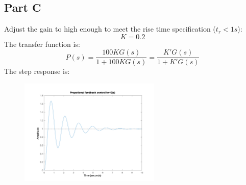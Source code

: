 \documentclass[a4paper]{article}
\begin{document}
\subsection{Part C} 
Adjust the gain to high enough to meet the rise time specification ($t_r < 1 s$):
$$
K = 0.2
$$
The transfer function is:
$$
P(s)  =\frac{100KG(s)}{1+100KG(s)} = \frac{K'G(s)}{1+K'G(s)}
$$
The step response is:
\begin{figure}[H]
\centering
\includegraphics[width = 0.6\textwidth]{pic/t3.png}
\end{figure}
\end{document}
